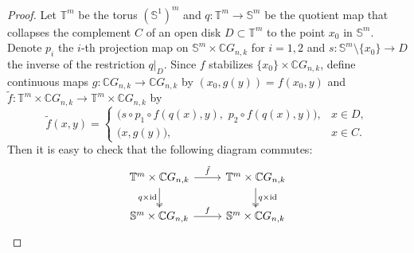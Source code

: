 \documentclass{amsart}
\begin{document}
	
	\begin{proof}
		Let $\mathbb T^m$ be the torus $(\mathbb S^1)^m$ and
		$q:\mathbb T^m\to \mathbb S^m$ be the quotient map that collapses the complement $C$ of an open disk $D\subset \mathbb T^m$ to the point $x_0$ in $\mathbb{S}^m$.  Denote $p_i$ the $i$-th projection map on $\mathbb S^m\times \mathbb CG_{n,k}$ for $i=1,2$ and %
$s:\mathbb S^m\setminus\{x_0\}\to D$  the %
inverse of the restriction $q|_D$.
		Since $f$ stabilizes $\{x_0\}\times \mathbb{C}G_{n,k}$, define continuous maps
		$g:\mathbb{C}G_{n,k}\to \mathbb{C}G_{n,k}$ by $(x_0,g(y)) = f(x_0,y)$ and $\tilde f:\mathbb T^m\times \mathbb{C}G_{n,k}\to \mathbb T^m\times \mathbb{C}G_{n,k}$ by
		\[
		\tilde f(x,y)=
		\begin{cases}
			\big(s\circ p_1\circ f(q(x),y),\,\,p_2\circ f(q(x),y)\big), & x\in D,\\[2pt]
			\big(x,g(y)\big), & x\in C.
		\end{cases}
		\]
		Then it is easy to check that the following diagram %
commutes:
		\[ \begin{tikzcd}
			{\mathbb T^m\times \mathbb{C}G_{n,k}} & {\mathbb T^m\times \mathbb{C}G_{n,k}} \\
			{\mathbb S^m\times \mathbb{C}G_{n,k}} & {\mathbb S^m\times \mathbb{C}G_{n,k}}
			\arrow["{\tilde f}", from=1-1, to=1-2]
			\arrow["{q\times \mathrm{id}}"', two heads, from=1-1, to=2-1]
			\arrow["{q\times \mathrm{id}}", two heads, from=1-2, to=2-2]
			\arrow["f", from=2-1, to=2-2]
		\end{tikzcd}
		\]
		

\end{proof}
\end{document}
